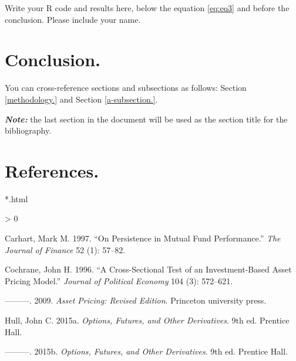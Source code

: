 \documentclass[12pt,halfline,a4paper,]{ouparticle}
\newlength{\cslhangindent}
\newenvironment{CSLReferences}[2] %
 {%
  \setlength{\parindent}{0pt}
  \ifodd #1 \everypar{\setlength{\hangindent}{\cslhangindent}}\ignorespaces\fi
  \ifnum #2 > 0
  \setlength{\parskip}{#2\baselineskip}
  \fi
 }%
 {}
\begin{document}
Write your R code and results here, below the equation \ref{eq:eq3} and
before the conclusion. Please include your name.

\hypertarget{conclusion.}{%
\section{Conclusion.}\label{conclusion.}}

You can cross-reference sections and subsections as follows: Section
\ref{methodology.} and Section \ref{a-subsection.}.

\textbf{\emph{Note:}} the last section in the document will be used as
the section title for the bibliography.

\hypertarget{references.}{%
\section{References.}\label{references.}}

*.html

\hypertarget{refs}{}
\begin{CSLReferences}{1}{0}
\leavevmode\hypertarget{ref-carhart1997persistence}{}%
Carhart, Mark M. 1997. {``On Persistence in Mutual Fund Performance.''}
\emph{The Journal of Finance} 52 (1): 57--82.

\leavevmode\hypertarget{ref-cochrane1996cross}{}%
Cochrane, John H. 1996. {``A Cross-Sectional Test of an Investment-Based
Asset Pricing Model.''} \emph{Journal of Political Economy} 104 (3):
572--621.

\leavevmode\hypertarget{ref-cochrane2009asset}{}%
---------. 2009. \emph{Asset Pricing: Revised Edition}. Princeton
university press.

\leavevmode\hypertarget{ref-Hull}{}%
Hull, John C. 2015a. \emph{Options, Futures, and Other Derivatives}. 9th
ed. Prentice Hall.

\leavevmode\hypertarget{ref-Hull2}{}%
---------. 2015b. \emph{Options, Futures, and Other Derivatives}. 9th
ed. Prentice Hall.

\end{CSLReferences}
\end{document}
